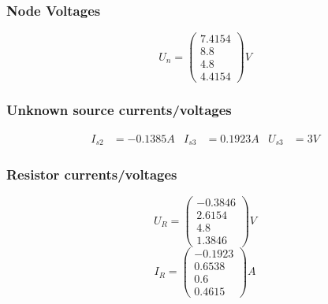 {\subsubsection{Node Voltages}
\begin{equation*}
   U_n = 
   \begin{pmatrix}
      7.4154\\ 8.8\\ 4.8\\ 4.4154
   \end{pmatrix}
   V
\end{equation*}

\subsubsection{Unknown source currents/voltages}
\begin{align*}
   I_{s2} &= -0.1385A &
   I_{s3} &= 0.1923A &
   U_{s3} &= 3V
\end{align*}   

\subsubsection{Resistor currents/voltages}
\begin{equation*}
   U_R =
   \begin{pmatrix}
      -0.3846\\ 2.6154\\ 4.8\\ 1.3846
   \end{pmatrix}
   V
\end{equation*}
\begin{equation*}
   I_R =
   \begin{pmatrix}
      -0.1923\\ 0.6538\\ 0.6\\ 0.4615
   \end{pmatrix}
   A
\end{equation*}

}
